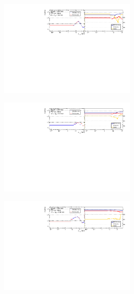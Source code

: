 \begin{figure}[htb]
    \centering 
    \begin{subfigure}{.99\textwidth}\centering
        \includegraphics[width = 0.75\textwidth]{Figures/m4l/UnfoldingStudies/v014_inputs/pt34_m4l60-100inputs.pdf}
    \end{subfigure}
    \begin{subfigure}{.99\textwidth}\centering
        \includegraphics[width = 0.75\textwidth]{Figures/m4l/UnfoldingStudies/v014_inputs/pt34_m4l120-130inputs.pdf}
    \end{subfigure}
    \begin{subfigure}{.99\textwidth}\centering
        \includegraphics[width = 0.75\textwidth]{Figures/m4l/UnfoldingStudies/v014_inputs/pt34_m4l180-2000inputs.pdf}

\end{subfigure}
\end{figure}
